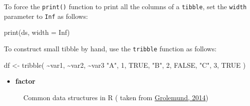 \documentclass[
  letterpaper,
  DIV=11,
  numbers=noendperiod]{scrreprt}
\newenvironment{Shaded}{\begin{snugshade}}{\end{snugshade}}
\newcommand{\AttributeTok}[1]{\textcolor[rgb]{0.40,0.45,0.13}{#1}}
\newcommand{\ConstantTok}[1]{\textcolor[rgb]{0.56,0.35,0.01}{#1}}
\newcommand{\DecValTok}[1]{\textcolor[rgb]{0.68,0.00,0.00}{#1}}
\newcommand{\FunctionTok}[1]{\textcolor[rgb]{0.28,0.35,0.67}{#1}}
\newcommand{\NormalTok}[1]{\textcolor[rgb]{0.00,0.23,0.31}{#1}}
\newcommand{\OtherTok}[1]{\textcolor[rgb]{0.00,0.23,0.31}{#1}}
\newcommand{\SpecialCharTok}[1]{\textcolor[rgb]{0.37,0.37,0.37}{#1}}
\newcommand{\StringTok}[1]{\textcolor[rgb]{0.13,0.47,0.30}{#1}}
\providecommand{\tightlist}{%
  \setlength{\itemsep}{0pt}\setlength{\parskip}{0pt}}\usepackage{longtable,booktabs,array}
\begin{document}
\begin{tcolorbox}[enhanced jigsaw, opacityback=0, title=\textcolor{quarto-callout-note-color}{\faInfo}\hspace{0.5em}{Printing tibble All Columns}, colback=white, leftrule=.75mm, colbacktitle=quarto-callout-note-color!10!white, bottomrule=.15mm, colframe=quarto-callout-note-color-frame, arc=.35mm, bottomtitle=1mm, coltitle=black, toptitle=1mm, toprule=.15mm, opacitybacktitle=0.6, rightrule=.15mm, titlerule=0mm, breakable, left=2mm]

To force the \texttt{print()} function to print all the columns of a
\texttt{tibble}, set the \texttt{width} parameter to \texttt{Inf} as
follows:

\begin{Shaded}
\begin{Highlighting}[]
\FunctionTok{print}\NormalTok{(ds, }\AttributeTok{width =} \ConstantTok{Inf}\NormalTok{)}
\end{Highlighting}
\end{Shaded}

\end{tcolorbox}

To construct small tibble by hand, use the \texttt{tribble} function as
follows:

\begin{Shaded}
\begin{Highlighting}[]
\NormalTok{df }\OtherTok{\textless{}{-}} \FunctionTok{tribble}\NormalTok{(}
  \SpecialCharTok{\textasciitilde{}}\NormalTok{var1, }\SpecialCharTok{\textasciitilde{}}\NormalTok{var2, }\SpecialCharTok{\textasciitilde{}}\NormalTok{var3}
  \StringTok{"A"}\NormalTok{, }\DecValTok{1}\NormalTok{, }\ConstantTok{TRUE}\NormalTok{,}
  \StringTok{"B"}\NormalTok{, }\DecValTok{2}\NormalTok{, }\ConstantTok{FALSE}\NormalTok{,}
  \StringTok{"C"}\NormalTok{, }\DecValTok{3}\NormalTok{, }\ConstantTok{TRUE}
\NormalTok{)}
\end{Highlighting}
\end{Shaded}

\begin{itemize}
\tightlist
\item
  \textbf{factor}
\end{itemize}

\begin{figure}


\caption{\label{fig-datastructure}Common data structures in R ( taken
from \href{https://jjallaire.github.io/hopr/objects.html}{Grolemund,
2014})}

\end{figure}%
\end{document}
